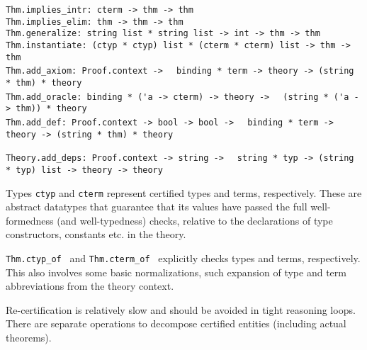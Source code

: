 \begin{isabellebody}
\begin{isamarkuptext}
\begin{mldecls}
  \verb|Thm.implies_intr: cterm -> thm -> thm| \\
  \verb|Thm.implies_elim: thm -> thm -> thm| \\
  \verb|Thm.generalize: string list * string list -> int -> thm -> thm| \\
  \verb|Thm.instantiate: (ctyp * ctyp) list * (cterm * cterm) list -> thm -> thm| \\
  \verb|Thm.add_axiom: Proof.context ->|\isasep\isanewline%
\verb|  binding * term -> theory -> (string * thm) * theory| \\
  \verb|Thm.add_oracle: binding * ('a -> cterm) -> theory ->|\isasep\isanewline%
\verb|  (string * ('a -> thm)) * theory| \\
  \verb|Thm.add_def: Proof.context -> bool -> bool ->|\isasep\isanewline%
\verb|  binding * term -> theory -> (string * thm) * theory| \\
  \end{mldecls}
  \begin{mldecls}
  \verb|Theory.add_deps: Proof.context -> string ->|\isasep\isanewline%
\verb|  string * typ -> (string * typ) list -> theory -> theory| \\
  \end{mldecls}

  \begin{description}

  \item Types \verb|ctyp| and \verb|cterm| represent certified
  types and terms, respectively.  These are abstract datatypes that
  guarantee that its values have passed the full well-formedness (and
  well-typedness) checks, relative to the declarations of type
  constructors, constants etc. in the theory.

  \item \verb|Thm.ctyp_of|~ and \verb|Thm.cterm_of|~ explicitly checks types and terms,
  respectively.  This also involves some basic normalizations, such
  expansion of type and term abbreviations from the theory context.

  Re-certification is relatively slow and should be avoided in tight
  reasoning loops.  There are separate operations to decompose
  certified entities (including actual theorems).


\end{description}
\end{isamarkuptext}
\end{isabellebody}
